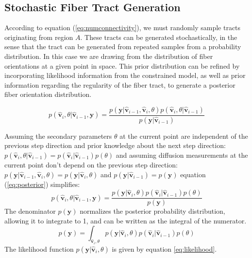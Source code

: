 \subsection{Stochastic Fiber Tract Generation}
According to equation (\ref{eq:numconnectivity}), we must randomly sample tracts originating from region $A$.  These tracts can be generated stochastically, in the sense that the tract can be generated from repeated samples from a probability distribution.  In this case we are drawing from the distribution of fiber orientations at a given point in space.  This prior distribution can be refined by incorporating likelihood information from the constrained model, as well as prior information regarding the regularity of the fiber tract, to generate a posterior fiber orientation distribution.

\begin{equation} \label{eq:posterior}
p({\mathbf{\hat{v}}_i, \theta | \mathbf{\hat{v}}_{i-1}, \mathbf{y}}) =
\frac {p(\mathbf{y}| \mathbf{\hat{v}}_{i-1}, \mathbf{\hat{v}}_i, \theta) p(\mathbf{\hat{v}}_i, \theta | \mathbf{\hat{v}}_{i-1})}
{p(\mathbf{y}|\mathbf{\hat{v}}_{i-1})}
\end{equation}

Assuming the secondary parameters $\theta$ at the current point are independent of the previous step direction and prior knowledge about the next step direction: $p(\mathbf{\hat{v}}_i, \theta | \mathbf{\hat{v}}_{i-1}) = p(\mathbf{\hat{v}}_i | \mathbf{\hat{v}}_{i-1})p(\theta)$ and assuming diffusion measurements at the current point don't depend on the previous step direction: $p(\mathbf{y}| \mathbf{\hat{v}}_{i-1}, \mathbf{\hat{v}}_i, \theta) = p(\mathbf{y}| \mathbf{\hat{v}}_i, \theta)$ and $p(\mathbf{y}|\mathbf{\hat{v}}_{i-1}) = p(\mathbf{y})$ equation (\ref{eq:posterior}) simplifies:
%
%
\begin{equation} \label{eq:posteriorsimp}
p({\mathbf{\hat{v}}_i, \theta | \mathbf{\hat{v}}_{i-1}, \mathbf{y}}) =
\frac {p(\mathbf{y}| \mathbf{\hat{v}}_i, \theta) p(\mathbf{\hat{v}}_i | \mathbf{\hat{v}}_{i-1}) p(\theta)}
{p(\mathbf{y})}
\end{equation}
%
%
The denominator $p(\mathbf{y})$ normalizes the posterior probability distribution, allowing it to integrate to 1, and can be written as the integral of the numerator.
%
%
\begin{equation} \label{eq:normalization}
p(\mathbf{y}) = \int_{\mathbf{\hat{v}}_i, \theta} p(\mathbf{y}| \mathbf{\hat{v}}_i, \theta) p(\mathbf{\hat{v}}_i | \mathbf{\hat{v}}_{i-1}) p(\theta)
\end{equation}
%
%
The likelihood function $p(\mathbf{y}| \mathbf{\hat{v}}_i, \theta)$ is given by equation \ref{eq:likelihood}.

